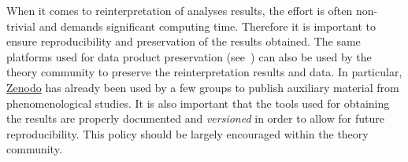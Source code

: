 \documentclass[11pt]{article}
\begin{document}
When it comes to reinterpretation of analyses results, the effort is often non-trivial and demands significant computing time. Therefore it is important to ensure reproducibility and  preservation of the results obtained.
The same platforms used for data product preservation (see~) can also be used by the theory community to preserve the reinterpretation results and data.
In particular, \href{https://zenodo.org/}{Zenodo} has already been used by a few groups to publish auxiliary material from phenomenological studies.
It is also important that the tools used for obtaining the results are properly documented and \emph{versioned} in order to allow for future reproducibility.
This policy should be largely encouraged within the theory community.


%
%
%
%
\end{document}
